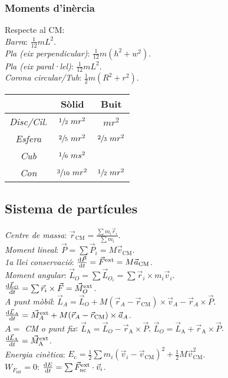 \subsubsection*{Moments d'inèrcia}
    Respecte al CM:\\
    \emph{Barra}: $\frac{1}{12}mL^2$. \\
    \emph{Pla (eix perpendicular)}: $\frac{1}{12}m(h^2+w^2)$. \\
    \emph{Pla (eix paral·lel)}: $\frac{1}{12}mL^2$. \\
    \emph{Corona circular/Tub}: $\frac{1}{2}m(R^2+r^2)$. \\
        \begin{tabular}{|c|c|c|} 
            \hline
            & Sòlid & Buit \\
            \hline
            \emph{Disc/Cil.} & $\sfrac{1}{2} \,\, mr^2$ & $mr^2$ \\ 
            \emph{Esfera} & $\sfrac{2}{5}\,\, mr^2$ & $\sfrac{2}{3}\,\, mr^2$ \\ 
            \emph{Cub} & $\sfrac{1}{6}\,\, ms^2$ & \\ 
            \emph{Con} & $\sfrac{3}{10}\,\, mr^2$ & $\sfrac{1}{2}\,\, mr^2$\\
            \hline
        \end{tabular}
  
\subsection{Sistema de part\'icules}
\emph{Centre de massa}: $\vec{r}_{\text{CM}} = \frac{\sum m_i \vec{r}_i}{\sum m_i}$. \\
\emph{Moment lineal}: $\vec{P} = \sum \vec{P}_i = M\vec{v}_{\text{CM}}$. \\
\emph{1a llei conservaci\'o}: $\frac{\dif \vec{P}}{\dif t} = \vec{F}^{\text{ext}} = 
  M \vec{a}_\text{CM}$. \\
\emph{Moment angular}: $\vec{L}_O = \sum \vec{L}_{O_i} = \sum \vec{r}_i \times m_i\vec{v}_i$. \\
\ci $\frac{\dif \vec{L}_O}{\dif t} = \sum \vec{r}_i\times\vec{F} = \vec{M}_O^{\text{ext}}$. \\
\emph{A punt m\`obil}: $\vec{L}_A = \vec{L}_O + M(\vec{r}_A - \vec{r}_{\text{CM}}) \times \vec{v}_A - \vec{r}_A\times\vec{P}$. \\
\ci $\frac{\dif \vec{L}_A}{\dif t} = \vec{M}_A^{\text{ext}} + M(\vec{r}_A - \vec{r}_{\text{CM}})\times \vec{a}_A$. \\
\emph{$A =$ CM o punt fix}: $\vec{L}_{\text{A}} = \vec{L}_O - \vec{r}_{\text{A}}\times\vec{P}$, $\vec{L}_O = \vec{L}_{\text{A}} + \vec{r}_{\text{A}}\times\vec{P}$. \\
\ci $\frac{\dif \vec{L}_{\text{A}}}{\dif t} = \vec{M}_{\text{A}}^{\text{ext}}$. \\
\emph{Energia cinètica}: $E_{\text{c}} = \frac{1}{2} \sum m_i (\vec{v}_i - \vec{v}_{\text{CM}})^2 + \frac{1}{2}  M\vec{v}_{\text{CM}}^2$.\\
\emph{$W_{F_{\text{int}}} = 0$}: $\frac{\dif E}{\dif t}  =\sum \vec{F}^{\text{ext}}_\text{nc}\cdot\vec{v}_i$.

